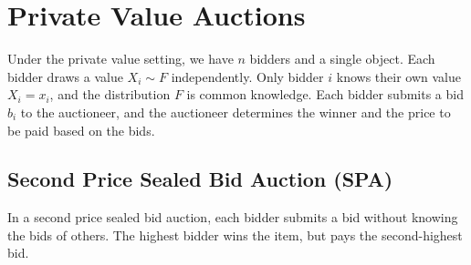 \chapter{Private Value Auctions}

Under the private value setting, we have $n$ bidders and a single object. Each bidder draws a value $X_i\sim F$ independently. Only bidder $i$ knows their own value $X_i = x_i$, and the distribution $F$ is common knowledge. Each bidder submits a bid $b_i$ to the auctioneer, and the auctioneer determines the winner and the price to be paid based on the bids.

\section{Second Price Sealed Bid Auction (SPA)}

In a second price sealed bid auction, each bidder submits a bid without knowing the bids of others. The highest bidder wins the item, but pays the second-highest bid.


